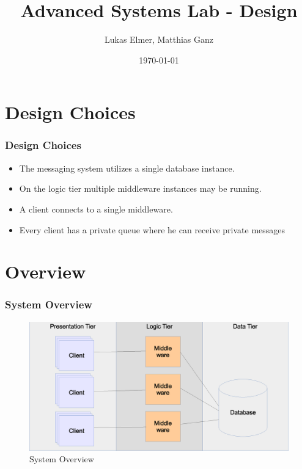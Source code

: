 \documentclass{beamer}
\title{Advanced Systems Lab - Design}
\author{Lukas Elmer, Matthias Ganz}
\date{\today}
\begin{document}

\begin{frame}
\titlepage
\end{frame} 




\section{Design Choices}
\begin{frame}
\frametitle{Design Choices}

\begin{itemize}
\item The messaging system utilizes a single database instance. 
\item On the logic tier multiple middleware instances may be running. 
\item A client connects to a single middleware.
\item{Every client has a private queue where he can receive private messages}

\end{itemize}

\end{frame}



\section{Overview}
\begin{frame}
\frametitle{System Overview}

\begin{figure}
  \begin{center}
    \includegraphics[scale=0.4]{../../drawings/system-overview.eps}
  \end{center}
  \caption{System Overview}
  \label{fig:system-overview}
\end{figure}


\end{frame}
\end{document}
